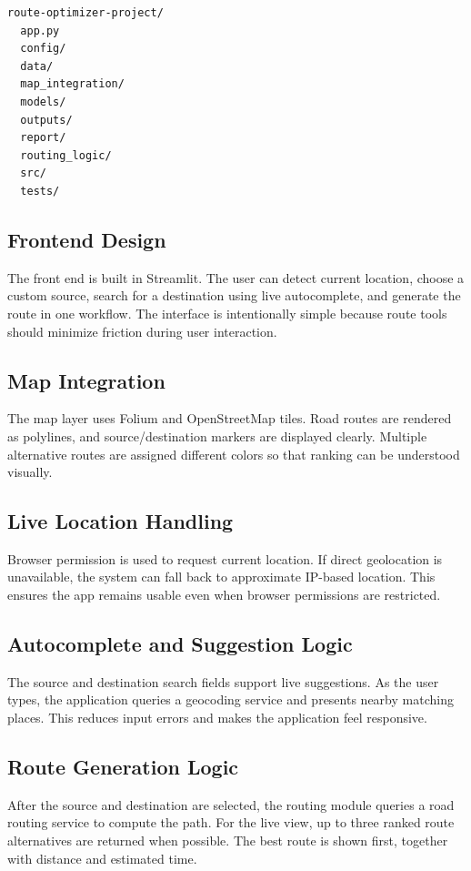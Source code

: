 \begin{verbatim}
route-optimizer-project/
  app.py
  config/
  data/
  map_integration/
  models/
  outputs/
  report/
  routing_logic/
  src/
  tests/
\end{verbatim}

\subsection{Frontend Design}
The front end is built in Streamlit. The user can detect current location, choose a custom source, search for a destination using live autocomplete, and generate the route in one workflow. The interface is intentionally simple because route tools should minimize friction during user interaction.

\subsection{Map Integration}
The map layer uses Folium and OpenStreetMap tiles. Road routes are rendered as polylines, and source/destination markers are displayed clearly. Multiple alternative routes are assigned different colors so that ranking can be understood visually.

\subsection{Live Location Handling}
Browser permission is used to request current location. If direct geolocation is unavailable, the system can fall back to approximate IP-based location. This ensures the app remains usable even when browser permissions are restricted.

\subsection{Autocomplete and Suggestion Logic}
The source and destination search fields support live suggestions. As the user types, the application queries a geocoding service and presents nearby matching places. This reduces input errors and makes the application feel responsive.

\subsection{Route Generation Logic}
After the source and destination are selected, the routing module queries a road routing service to compute the path. For the live view, up to three ranked route alternatives are returned when possible. The best route is shown first, together with distance and estimated time.

